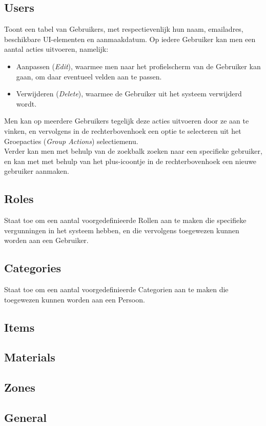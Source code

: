 \documentclass[]{memoir}
\begin{document}
\subsection{Users}
Toont een tabel van Gebruikers, met respectievenlijk hun naam, emailadres, beschikbare UI-elementen en aanmaakdatum. 
Op iedere Gebruiker kan men een aantal acties uitvoeren, namelijk:
\begin{itemize}
	\item Aanpassen (\textsl{Edit}), waarmee men naar het profielscherm van de Gebruiker kan gaan, om daar eventueel velden aan te passen.
	\item Verwijderen (\textsl{Delete}), waarmee de Gebruiker uit het systeem verwijderd wordt.
\end{itemize}
Men kan op meerdere Gebruikers tegelijk deze acties uitvoeren door ze aan te vinken, en vervolgens in de rechterbovenhoek een optie te selecteren uit het Groepacties  (\textsl{Group Actions}) selectiemenu.\\
Verder kan men met behulp van de zoekbalk zoeken naar een specifieke gebruiker, en kan met met behulp van het plus-icoontje in de rechterbovenhoek een nieuwe gebruiker aanmaken.
\subsection{Roles}
Staat toe om een aantal voorgedefinieerde Rollen aan te maken die specifieke vergunningen in het systeem hebben, en die vervolgens toegewezen kunnen worden aan een Gebruiker.\\

\subsection{Categories}
Staat toe om een aantal voorgedefinieerde Categorien aan te maken die toegewezen kunnen worden aan een Persoon.
\subsection{Items}
\subsection{Materials}
\subsection{Zones}
\subsection{General}
\end{document}
